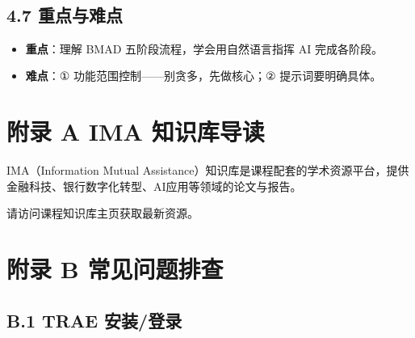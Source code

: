 \documentclass[
  american,
  chinese,
]{ctexart}
\providecommand{\tightlist}{%
  \setlength{\itemsep}{0pt}\setlength{\parskip}{0pt}}
\begin{document}
\foreignlanguage{american}{}

~

\subsection{\texorpdfstring{\foreignlanguage{american}{4.7 }{\foreignlanguage{american}{重点与难点}}}{4.7 重点与难点}}\label{ux91cdux70b9ux4e0eux96beux70b9-1}

\begin{itemize}
\tightlist
\item
  \textbf{{重点}}{：理解}\foreignlanguage{american}{ BMAD }{五阶段流程，学会用自然语言指挥}\foreignlanguage{american}{ AI }{完成各阶段。}\foreignlanguage{american}{}
\item
  \textbf{{难点}}{：}\foreignlanguage{american}{① }{功能范围控制}\foreignlanguage{american}{------}{别贪多，先做核心；}\foreignlanguage{american}{② }{提示词要明确具体。}\foreignlanguage{american}{}
\end{itemize}

\appendix

\clearpage

\section{\texorpdfstring{{附录}\foreignlanguage{american}{ A IMA }{知识库导读}\foreignlanguage{american}{}}{附录 A IMA 知识库导读}}\label{ux9644ux5f55-a-ima-ux77e5ux8bc6ux5e93ux5bfcux8bfb}

{IMA（Information Mutual Assistance）知识库是课程配套的学术资源平台，提供金融科技、银行数字化转型、AI应用等领域的论文与报告。}\foreignlanguage{american}{}

{请访问课程知识库主页获取最新资源。}\foreignlanguage{american}{}

\clearpage

\section{\texorpdfstring{{附录}\foreignlanguage{american}{ B }{常见问题排查}\foreignlanguage{american}{}}{附录 B 常见问题排查}}\label{ux9644ux5f55-b-ux5e38ux89c1ux95eeux9898ux6392ux67e5}

\subsection{\texorpdfstring{\foreignlanguage{american}{B.1 TRAE }{安装}\foreignlanguage{american}{/}{登录}\foreignlanguage{american}{}}{B.1 TRAE 安装/登录}}\label{b.1-trae-ux5b89ux88c5ux767bux5f55}
\end{document}
